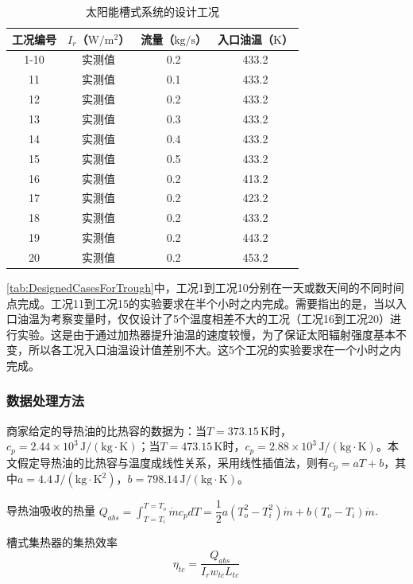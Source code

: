 \begin{table}[htbp]
\setlength{\abovecaptionskip}{0pt}
	\caption{太阳能槽式系统的设计工况}
	\centering
	\begin{tabular}{cccc}
		\toprule
		工况编号	& $I_r$（$\mathrm{W/m^2}$）&	流量（$\mathrm{kg/s}$）			&	入口油温（$\mathrm{K}$）\\
		\midrule
		1-10	&	实测值	&	0.2	&	433.2\\
		11	&	实测值	&	0.1	&	433.2\\
		12	&	实测值	&	0.2	&	433.2\\
		13	&	实测值	&	0.3	&	433.2\\
		14	&	实测值	&	0.4	&	433.2\\
		15	&	实测值	&	0.5	&	433.2\\
		16	&	实测值	&	0.2	&	413.2\\
		17	&	实测值	&	0.2	&	423.2\\
		18	&	实测值	&	0.2	&	433.2\\
		19	&	实测值	&	0.2	&	443.2\\
		20	&	实测值	&	0.2	&	453.2\\
		\bottomrule
	\end{tabular}
	\label{tab:DesignedCasesForTrough}
\end{table}

\autoref{tab:DesignedCasesForTrough}中，工况1到工况10分别在一天或数天间的不同时间点完成。工况11到工况15的实验要求在半个小时之内完成。需要指出的是，当以入口油温为考察变量时，仅仅设计了5个温度相差不大的工况（工况16到工况20）进行实验。这是由于通过加热器提升油温的速度较慢，为了保证太阳辐射强度基本不变，所以各工况入口油温设计值差别不大。这5个工况的实验要求在一个小时之内完成。

\subsubsection{数据处理方法}
商家给定的导热油的比热容的数据为：当$T = 373.15\,\mathrm{K}$时，$c_p = 2.44\times10^3\,\mathrm{J/(kg\cdot K)}$；当$T = 473.15\,\mathrm{K}$时，$c_p = 2.88\times10^3\,\mathrm{J/(kg\cdot K)}$。本文假定导热油的比热容与温度成线性关系，采用线性插值法，则有$c_p = aT + b$，其中$a = 4.4\,\mathrm{J/(kg \cdot K^2)}$，$b = 798.14\,\mathrm{J/(kg\cdot K)}$。

导热油吸收的热量 $Q_{abs} = \int_{T=T_i}^{T = T_o}\dot{m}c_pdT = \dfrac{1}{2}a(T_o^2 - T_i^2)\dot{m} + b (T_o - T_i)\dot{m}$.

槽式集热器的集热效率
\begin{equation}
	\eta_{tc} = \dfrac{Q_{abs}}{I_rw_{tc}L_{tc}}
	\label{eq:ExperimentEta}
\end{equation}

